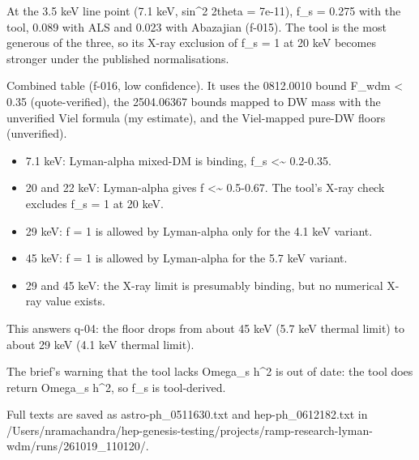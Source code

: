 \documentclass[11pt,a4paper]{article}
\begin{document}
At the 3.5 keV line point (7.1 keV, sin\textasciicircum{}2 2theta = 7e-11), f\_s = 0.275 with the tool, 0.089 with ALS and 0.023 with Abazajian (f-015). The tool is the most generous of the three, so its X-ray exclusion of f\_s = 1 at 20 keV becomes stronger under the published normalisations.

Combined table (f-016, low confidence). It uses the 0812.0010 bound F\_wdm \textless{} 0.35 (quote-verified), the 2504.06367 bounds mapped to DW mass with the unverified Viel formula (my estimate), and the Viel-mapped pure-DW floors (unverified).

\begin{itemize}
  \item 7.1 keV: Lyman-alpha mixed-DM is binding, f\_s \textless{}\textasciitilde{} 0.2-0.35.
  \item 20 and 22 keV: Lyman-alpha gives f \textless{}\textasciitilde{} 0.5-0.67. The tool's X-ray check excludes f\_s = 1 at 20 keV.
  \item 29 keV: f = 1 is allowed by Lyman-alpha only for the 4.1 keV variant.
  \item 45 keV: f = 1 is allowed by Lyman-alpha for the 5.7 keV variant.
  \item 29 and 45 keV: the X-ray limit is presumably binding, but no numerical X-ray value exists.
\end{itemize}
This answers q-04: the floor drops from about 45 keV (5.7 keV thermal limit) to about 29 keV (4.1 keV thermal limit).

The brief's warning that the tool lacks Omega\_s h\textasciicircum{}2 is out of date: the tool does return Omega\_s h\textasciicircum{}2, so f\_s is tool-derived.

Full texts are saved as astro-ph\_0511630.txt and hep-ph\_0612182.txt in /Users/nramachandra/hep-genesis-testing/projects/ramp-research-lyman-wdm/runs/261019\_110120/.
\end{document}
